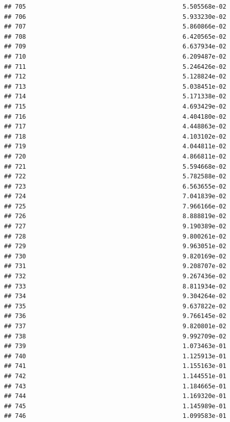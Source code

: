 \documentclass[
]{article}
\begin{document}
\begin{verbatim}
## 705                                           5.505568e-02
## 706                                           5.933230e-02
## 707                                           5.860866e-02
## 708                                           6.420565e-02
## 709                                           6.637934e-02
## 710                                           6.209487e-02
## 711                                           5.246426e-02
## 712                                           5.128824e-02
## 713                                           5.038451e-02
## 714                                           5.171338e-02
## 715                                           4.693429e-02
## 716                                           4.404180e-02
## 717                                           4.448863e-02
## 718                                           4.103102e-02
## 719                                           4.044811e-02
## 720                                           4.866811e-02
## 721                                           5.594668e-02
## 722                                           5.782588e-02
## 723                                           6.563655e-02
## 724                                           7.041839e-02
## 725                                           7.966166e-02
## 726                                           8.888819e-02
## 727                                           9.190389e-02
## 728                                           9.800261e-02
## 729                                           9.963051e-02
## 730                                           9.820169e-02
## 731                                           9.208707e-02
## 732                                           9.267436e-02
## 733                                           8.811934e-02
## 734                                           9.304264e-02
## 735                                           9.637822e-02
## 736                                           9.766145e-02
## 737                                           9.820801e-02
## 738                                           9.992709e-02
## 739                                           1.073463e-01
## 740                                           1.125913e-01
## 741                                           1.155163e-01
## 742                                           1.144551e-01
## 743                                           1.184665e-01
## 744                                           1.169320e-01
## 745                                           1.145989e-01
## 746                                           1.099583e-01

\end{verbatim}
\end{document}
